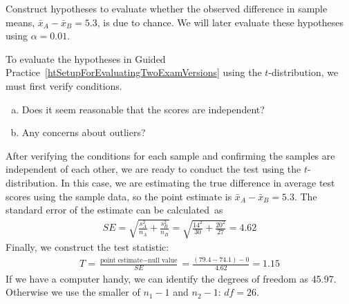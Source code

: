 \begin{exercisewrap}
\begin{nexercise}
\label{htSetupForEvaluatingTwoExamVersions}%
Construct hypotheses to evaluate whether the observed
difference in sample means, $\bar{x}_A - \bar{x}_B=5.3$,
is due to chance. We will later evaluate these hypotheses
using $\alpha = 0.01$.\footnotemark{}
\end{nexercise}
\end{exercisewrap}


\begin{exercisewrap}
\begin{nexercise} \label{conditionsForTDistForEvaluatingTwoExamVersions}%
To evaluate the hypotheses in Guided Practice~\ref{htSetupForEvaluatingTwoExamVersions} using the $t$-distribution, we must first verify conditions.\footnotemark{}
\begin{enumerate}[(a)]
\setlength{\itemsep}{0mm}
\item
    Does it seem reasonable that the scores are independent?
\item
    Any concerns about outliers?
\end{enumerate}
\end{nexercise}
\end{exercisewrap}

After verifying the conditions for each sample and confirming the samples are independent of each other, we are ready to conduct the test using the $t$-distribution. In this case, we are estimating the true difference in average test scores using the sample data, so the point estimate is $\bar{x}_A - \bar{x}_B = 5.3$. The standard error of the estimate can be calculated~as
\begin{align*}
SE
  = \sqrt{\frac{s_A^2}{n_A} + \frac{s_B^2}{n_B}}
  = \sqrt{\frac{14^2}{30} + \frac{20^2}{27}}
  = 4.62
\end{align*}
Finally, we construct the test statistic:
\begin{align*}
T
  = \frac{\text{point estimate} - \text{null value}}{SE}
  = \frac{(79.4-74.1) - 0}{4.62}
  = 1.15
\end{align*}
If we have a computer handy, we can identify the degrees
of freedom as 45.97.
Otherwise we use the smaller of $n_1-1$ and $n_2-1$: $df=26$.

